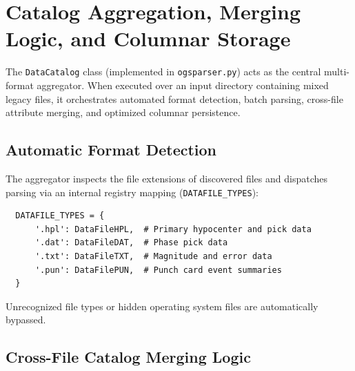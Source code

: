 \section{Catalog Aggregation, Merging Logic, and Columnar Storage}
\label{sec:catalog_aggregation}

The \texttt{DataCatalog} class (implemented in \texttt{ogsparser.py}) acts as the central multi-format aggregator. When executed over an input directory containing mixed legacy files, it orchestrates automated format detection, batch parsing, cross-file attribute merging, and optimized columnar persistence.

\subsection{Automatic Format Detection}
\label{subsec:format_detection}

The aggregator inspects the file extensions of discovered files and dispatches parsing via an internal registry mapping (\texttt{DATAFILE\_TYPES}):
\begin{verbatim}
  DATAFILE_TYPES = {
      '.hpl': DataFileHPL,  # Primary hypocenter and pick data
      '.dat': DataFileDAT,  # Phase pick data
      '.txt': DataFileTXT,  # Magnitude and error data
      '.pun': DataFilePUN,  # Punch card event summaries
  }
\end{verbatim}
Unrecognized file types or hidden operating system files are automatically bypassed.

\subsection{Cross-File Catalog Merging Logic}
\label{subsec:merge_logic}

